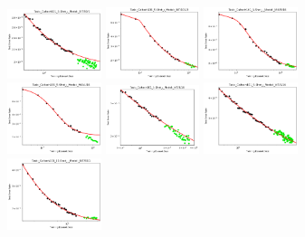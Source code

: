 \documentclass{article} %
\begin{document}
\begin{figure}
    \centering

\includegraphics[width=0.245\textwidth]{figures/scaling_laws_benchmark_dataset_plots/caltech_5shot___BiT_50_1.png}
\includegraphics[width=0.245\textwidth]{figures/scaling_laws_benchmark_dataset_plots/caltech_5shot___BiT_101_3.png}
\includegraphics[width=0.245\textwidth]{figures/scaling_laws_benchmark_dataset_plots/caltech_5shot___MiX_B_16.png}
\includegraphics[width=0.245\textwidth]{figures/scaling_laws_benchmark_dataset_plots/caltech_5shot___MiX_L_16.png}
\includegraphics[width=0.245\textwidth]{figures/scaling_laws_benchmark_dataset_plots/caltech_5shot___ViT_B_16.png}
\includegraphics[width=0.245\textwidth]{figures/scaling_laws_benchmark_dataset_plots/caltech_5shot___ViT_S_16.png}
\includegraphics[width=0.245\textwidth]{figures/scaling_laws_benchmark_dataset_plots/caltech_10shot___BiT_50_1.png}

\end{figure}
\end{document}
